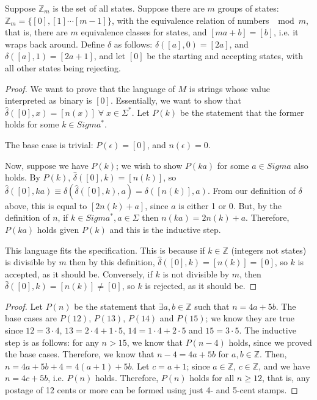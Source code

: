 
Suppose $\mathbb{Z}_m$ is the set of all states. Suppose there are $m$ groups of states: $\mathbb{Z}_m = \{[0], [1] \cdots [m - 1]\}$, with the equivalence relation of numbers $\mod m$, that is, there are $m$ equivalence classes for states, and $[ma + b] = [b]$, i.e. it wraps back around. Define $\delta$ as follows: $\delta([a], 0) = [2a]$, and $\delta([a], 1) = [2a + 1]$, and let $[0]$ be the starting and accepting states, with all other states being rejecting.

\begin{proof}
  We want to prove that the language of $M$ is strings whose value interpreted as binary is $[0]$. Essentially, we want to show that $\hat{\delta}([0], x) = [n(x)] \;\forall\; x \in \Sigma^*$. Let $P(k)$ be the statement that the former holds for some $k \in Sigma^*$.

  The base case is trivial: $P(\epsilon) = [0]$, and $n(\epsilon) = 0$.

  Now, suppose we have $P(k)$; we wish to show $P(ka)$ for some $a \in Sigma$ also holds. By $P(k)$, $\hat{\delta}([0], k) = [n(k)]$, so $\hat{\delta}([0], ka) \equiv \delta(\hat{\delta}([0], k), a) = \delta([n(k)], a)$. From our definition of $\delta$ above, this is equal to $[2n(k) + a]$, since $a$ is either 1 or 0. But, by the definition of $n$, if $k \in Sigma^*, a \in \Sigma$ then $n(ka) = 2n(k) + a$. Therefore, $P(ka)$ holds given $P(k)$ and this is the inductive step.

  This language fits the specification. This is because if $k \in \mathbb{Z}$ (integers not states) is divisible by $m$ then by this definition, $\hat{\delta}([0], k) = [n(k)] = [0]$, so $k$ is accepted, as it should be. Conversely, if $k$ is not divisible by $m$, then $\hat{\delta}([0], k) = [n(k)] \neq [0]$, so $k$ is rejected, as it should be.
\end{proof}


\begin{proof}
  Let $P(n)$ be the statement that $\exists a, b \in \mathbb{Z}$ such that $n = 4a + 5b$. The base cases are $P(12)$, $P(13)$, $P(14)$ and $P(15)$; we know they are true since $12 = 3 \cdot 4$, $13 = 2 \cdot 4 + 1 \cdot 5$, $14 = 1 \cdot 4 + 2 \cdot 5$ and $15 = 3 \cdot 5$. The inductive step is as follows: for any $n > 15$, we know that $P(n - 4)$ holds, since we proved the base cases. Therefore, we know that $n - 4 = 4a + 5b$ for $a, b \in \mathbb{Z}$. Then, $n = 4a + 5b + 4 = 4(a + 1) + 5b$. Let $c = a + 1$; since $a \in \mathbb{Z}$, $c \in \mathbb{Z}$, and we have $n = 4c + 5b$, i.e. $P(n)$ holds. Therefore, $P(n)$ holds for all $n \geq 12$, that is, any postage of 12 cents or more can be formed using just 4- and 5-cent stamps.
\end{proof}

